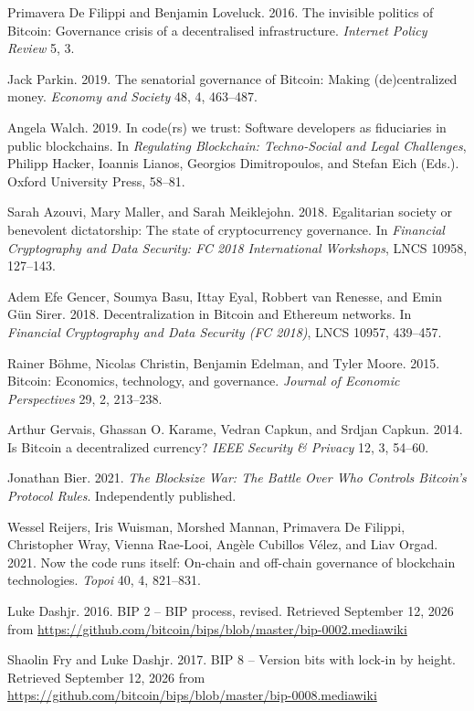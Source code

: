
Primavera De Filippi and Benjamin Loveluck. 2016. The invisible politics of Bitcoin: Governance crisis of a decentralised infrastructure. \emph{Internet Policy Review} 5, 3.

Jack Parkin. 2019. The senatorial governance of Bitcoin: Making (de)centralized money. \emph{Economy and Society} 48, 4, 463--487.

Angela Walch. 2019. In code(rs) we trust: Software developers as fiduciaries in public blockchains. In \emph{Regulating Blockchain: Techno-Social and Legal Challenges}, Philipp Hacker, Ioannis Lianos, Georgios Dimitropoulos, and Stefan Eich (Eds.). Oxford University Press, 58--81.

Sarah Azouvi, Mary Maller, and Sarah Meiklejohn. 2018. Egalitarian society or benevolent dictatorship: The state of cryptocurrency governance. In \emph{Financial Cryptography and Data Security: FC 2018 International Workshops}, LNCS 10958, 127--143.

Adem Efe Gencer, Soumya Basu, Ittay Eyal, Robbert van Renesse, and Emin G\"un Sirer. 2018. Decentralization in Bitcoin and Ethereum networks. In \emph{Financial Cryptography and Data Security (FC 2018)}, LNCS 10957, 439--457.

Rainer B\"ohme, Nicolas Christin, Benjamin Edelman, and Tyler Moore. 2015. Bitcoin: Economics, technology, and governance. \emph{Journal of Economic Perspectives} 29, 2, 213--238.

Arthur Gervais, Ghassan O. Karame, Vedran Capkun, and Srdjan Capkun. 2014. Is Bitcoin a decentralized currency? \emph{IEEE Security \& Privacy} 12, 3, 54--60.

Jonathan Bier. 2021. \emph{The Blocksize War: The Battle Over Who Controls Bitcoin's Protocol Rules}. Independently published.

Wessel Reijers, Iris Wuisman, Morshed Mannan, Primavera De Filippi, Christopher Wray, Vienna Rae-Looi, Ang\`ele Cubillos V\'elez, and Liav Orgad. 2021. Now the code runs itself: On-chain and off-chain governance of blockchain technologies. \emph{Topoi} 40, 4, 821--831.

Luke Dashjr. 2016. BIP 2 -- BIP process, revised. Retrieved September 12, 2026 from \url{https://github.com/bitcoin/bips/blob/master/bip-0002.mediawiki}

Shaolin Fry and Luke Dashjr. 2017. BIP 8 -- Version bits with lock-in by height. Retrieved September 12, 2026 from \url{https://github.com/bitcoin/bips/blob/master/bip-0008.mediawiki}

